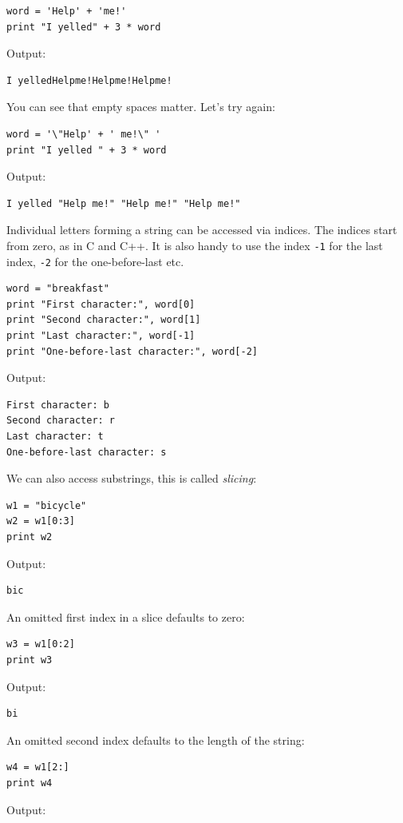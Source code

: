 \begin{verbatim}
word = 'Help' + 'me!'
print "I yelled" + 3 * word
\end{verbatim}
Output:

\begin{verbatim}
I yelledHelpme!Helpme!Helpme!
\end{verbatim}
You can see that empty spaces matter. Let's try again:

\begin{verbatim}
word = '\"Help' + ' me!\" '
print "I yelled " + 3 * word
\end{verbatim}
Output:

\begin{verbatim}
I yelled "Help me!" "Help me!" "Help me!"
\end{verbatim}
Individual letters forming a string can be accessed via indices. The indices 
start from zero, as in C and C++. It is also handy to use the index {\tt -1} 
for the last index, {\tt -2} for the one-before-last etc.


\begin{verbatim}
word = "breakfast"
print "First character:", word[0]
print "Second character:", word[1]
print "Last character:", word[-1]
print "One-before-last character:", word[-2]
\end{verbatim}
Output:

\begin{verbatim}
First character: b
Second character: r
Last character: t
One-before-last character: s
\end{verbatim}
We can also access substrings, this is called {\em slicing}:

\begin{verbatim}
w1 = "bicycle"
w2 = w1[0:3]
print w2
\end{verbatim}
Output:

\begin{verbatim}
bic
\end{verbatim}
An omitted first index in a slice defaults to zero:

\begin{verbatim}
w3 = w1[0:2]
print w3
\end{verbatim}
Output:

\begin{verbatim}
bi
\end{verbatim}
An omitted second index defaults to the length of the string:

\begin{verbatim}
w4 = w1[2:]
print w4
\end{verbatim}
Output:

